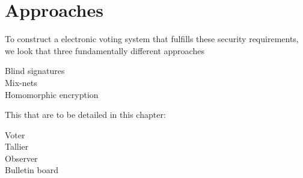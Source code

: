 \section{Approaches}
To construct a electronic voting system that fulfills these security requirements, we look that three fundamentally different approaches 

\begin{description}
    \item[Blind signatures]

    \item[Mix-nets]        
        
    \item[Homomorphic encryption]
\end{description}

This that are to be detailed in this chapter: 

\begin{description}
    \item[Voter]
    \item[Tallier]
    \item[Observer]
    \item[Bulletin board]
\end{description}